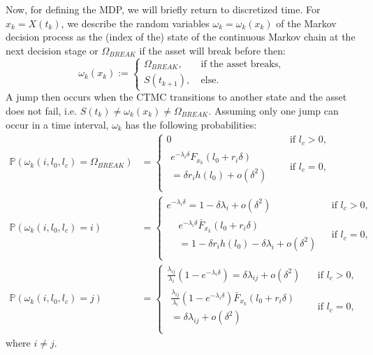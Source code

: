 Now, for defining the MDP, we will briefly return to discretized time.
For $x_k=X(t_k)$, we describe the random variables $\omega_k=\omega_k(x_k)$ of the Markov decision process as the (index of the) state of the continuous Markov chain at the next decision stage or $\Omega_{BREAK}$ if the asset will break before then:
\[
\omega_k(x_k):=\begin{cases}
\Omega_{BREAK},&\ \text{if the asset breaks,}\\
S(t_{k+1}),&\ \text{else.}
\end{cases}
\]
A jump then occurs when the CTMC transitions to another state and the asset does not fail, i.e. $S(t_k)\neq\omega_k(x_k)\neq\Omega_{BREAK}$.
Assuming only one jump can occur in a time interval, $\omega_k$ has the following probabilities:
\[
\begin{split}
\mathbb{P}(\omega_k(i,l_0,l_c)=\Omega_{BREAK})&=\begin{cases}
	0&\text{ if }l_c>0,\\
	\begin{split}
	e^{-\lambda_{i}\delta}F_{x_k}(l_0+r_i\delta)&\\
	=\delta r_ih(l_0)+o(\delta^2)&
	\end{split}&\text{ if }l_c=0,\\
\end{cases}\\
\mathbb{P}(\omega_k(i,l_0,l_c)=i)&=\begin{cases}
	e^{-\lambda_i \delta}=1-\delta\lambda_i+o(\delta^2)&\text{ if }l_c>0,\\
	\begin{split}
	&e^{-\lambda_i \delta} \bar{F}_{x_k}(l_0+r_i\delta)\\
	&=1-\delta r_ih(l_0)-\delta\lambda_i+o(\delta^2)
	\end{split}&\text{ if }l_c=0,\\
\end{cases}\\
\mathbb{P}(\omega_k(i,l_0,l_c)=j)&=\begin{cases}
	\frac{\lambda_{ij}}{\lambda_i}(1-e^{-\lambda_i \delta})=\delta\lambda_{ij}+o(\delta^2) & \text{ if }l_c>0,\\
	\begin{split}
	\frac{\lambda_{ij}}{\lambda_i}(1-e^{-\lambda_i \delta})\bar{F}_{x_k}(l_0+r_i\delta)&\\
	=\delta\lambda_{ij}+o(\delta^2)&
	\end{split}&\text{ if }l_c=0,\\
\end{cases}
\end{split}
\]
where $i\neq j$.

